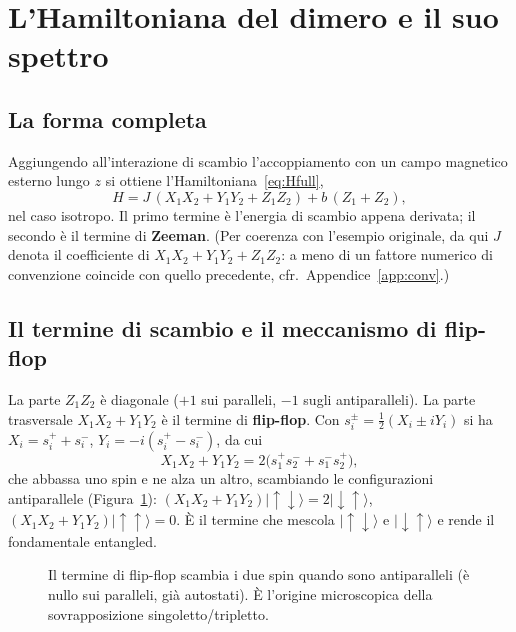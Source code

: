 \documentclass[11pt,a4paper]{article}
\newcommand{\ket}[1]{\lvert #1 \rangle}
\newcommand{\up}{\uparrow}
\newcommand{\dn}{\downarrow}
\theoremstyle{definition}
\theoremstyle{remark}
\newcommand{\arrowup}[2]{\draw[spinup,line width=1.2pt,-{Stealth[length=2.4mm,width=2mm]}] (#1,{#2-0.22}) -- (#1,{#2+0.24});}
\newcommand{\arrowdn}[2]{\draw[spindown,line width=1.2pt,-{Stealth[length=2.4mm,width=2mm]}] (#1,{#2+0.22}) -- (#1,{#2-0.24});}
\begin{document}
\FloatBarrier
\section{L'Hamiltoniana del dimero e il suo spettro}
\label{sec:dimero}

\subsection{La forma completa}

Aggiungendo all'interazione di scambio l'accoppiamento con un campo magnetico esterno lungo $z$ si ottiene
l'Hamiltoniana~\eqref{eq:Hfull},
\[
H = J\,(X_1X_2+Y_1Y_2+Z_1Z_2) + b\,(Z_1+Z_2),
\]
nel caso isotropo. Il primo termine è l'energia di scambio appena derivata; il secondo è il termine di
\textbf{Zeeman}. (Per coerenza con l'esempio originale, da qui $J$ denota il coefficiente di
$X_1X_2+Y_1Y_2+Z_1Z_2$: a meno di un fattore numerico di convenzione coincide con quello precedente, cfr.\
Appendice~\ref{app:conv}.)

\subsection{Il termine di scambio e il meccanismo di flip-flop}

La parte $Z_1Z_2$ è diagonale ($+1$ sui paralleli, $-1$ sugli antiparalleli). La parte trasversale
$X_1X_2+Y_1Y_2$ è il termine di \textbf{flip-flop}. Con $s_i^{\pm}=\tfrac12(X_i\pm iY_i)$ si ha
$X_i=s_i^++s_i^-$, $Y_i=-i(s_i^+-s_i^-)$, da cui
\begin{equation}
X_1X_2+Y_1Y_2=2\big(s_1^{+}s_2^{-}+s_1^{-}s_2^{+}\big),
\end{equation}
che abbassa uno spin e ne alza un altro, scambiando le configurazioni antiparallele
(Figura~\ref{fig:flipflop}): $(X_1X_2+Y_1Y_2)\ket{\up\dn}=2\ket{\dn\up}$, $(X_1X_2+Y_1Y_2)\ket{\up\up}=0$.
È il termine che mescola $\ket{\up\dn}$ e $\ket{\dn\up}$ e rende il fondamentale entangled.

\begin{figure}[htbp]
\centering
{}
\caption{Il termine di flip-flop scambia i due spin quando sono antiparalleli (è nullo sui paralleli, già
autostati). È l'origine microscopica della sovrapposizione singoletto/tripletto.}
\label{fig:flipflop}
\end{figure}
\end{document}
